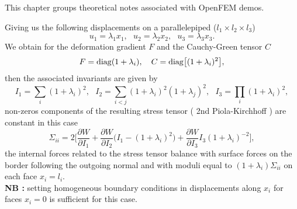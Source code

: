 
This chapter groups theoretical notes associated with OpenFEM demos.



Giving us the following displacements on a parallelepiped ($l_1 \times l_2 \times l_3$)%
\begin{equation}
  u_1=\lambda_1 x_1,\ \ \  u_2=\lambda_2 x_2,\ \ \  u_3=\lambda_3 x_3.
\end{equation}
We obtain for the deformation gradient $F$ and the Cauchy-Green tensor $C$ %
\begin{equation}
  F={\rm diag}(1+\lambda_i),\ \ \  C={\rm diag}\bigl[(1+\lambda_i)^2\bigr],
\end{equation}
then the associated invariants are given by
\begin{equation}
  I_1=\sum_i(1+\lambda_i)^2,\ \ \  I_2=\sum_{i<j}(1+\lambda_i)^2(1+\lambda_j)^2,\ \ \  
  I_3=\prod_i(1+\lambda_i)^2,
\end{equation}
non-zeros components of the resulting stress tensor ( 2nd Piola-Kirchhoff ) are constant in this case %
\begin{equation}
  \Sigma_{ii}=2\biggl[ \frac{\partial W}{\partial I_1} + 
  \frac{\partial W}{\partial I_2}\bigl(I_1-(1+\lambda_i)^2\bigr) +
  \frac{\partial W}{\partial I_3}I_3(1+\lambda_i)^{-2} \biggr],
\end{equation}
the internal forces related to the stress tensor balance with surface forces on the border following the outgoing normal and with moduli equal to $(1+\lambda_i)\Sigma_{ii}$ on each face $x_i=l_i$.\\%
{\bf NB :} setting homogeneous boundary conditions in displacements along $x_i$ for faces $x_i=0$ is sufficient for this case.\\%

